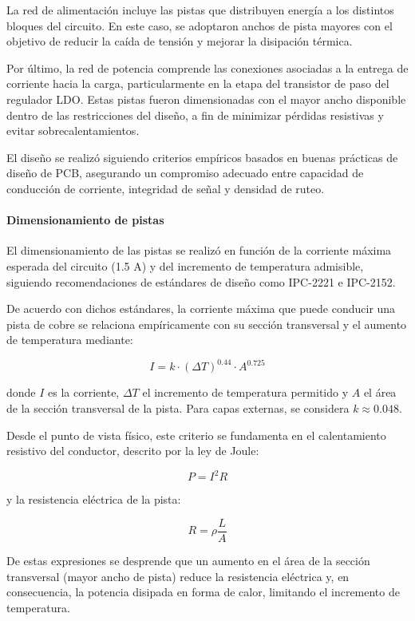\documentclass[]{article}
\begin{document}
	La red de alimentación incluye las pistas que distribuyen energía a los distintos bloques del circuito. En este caso, se adoptaron anchos de pista mayores con el objetivo de reducir la caída de tensión y mejorar la disipación térmica.
	
	Por último, la red de potencia comprende las conexiones asociadas a la entrega de corriente hacia la carga, particularmente en la etapa del transistor de paso del regulador LDO. Estas pistas fueron dimensionadas con el mayor ancho disponible dentro de las restricciones del diseño, a fin de minimizar pérdidas resistivas y evitar sobrecalentamientos.
	
	El diseño se realizó siguiendo criterios empíricos basados en buenas prácticas de diseño de PCB, asegurando un compromiso adecuado entre capacidad de conducción de corriente, integridad de señal y densidad de ruteo.
	
	
	\paragraph{Dimensionamiento de pistas}
	
	El dimensionamiento de las pistas se realizó en función de la corriente máxima esperada del circuito (1.5 A) y del incremento de temperatura admisible, siguiendo recomendaciones de estándares de diseño como IPC-2221 e IPC-2152.
	
	De acuerdo con dichos estándares, la corriente máxima que puede conducir una pista de cobre se relaciona empíricamente con su sección transversal y el aumento de temperatura mediante:
	
	\[
	I = k \cdot (\Delta T)^{0.44} \cdot A^{0.725}
	\]
	
	donde \( I \) es la corriente, \( \Delta T \) el incremento de temperatura permitido y \( A \) el área de la sección transversal de la pista. Para capas externas, se considera \( k \approx 0.048 \).
	
	Desde el punto de vista físico, este criterio se fundamenta en el calentamiento resistivo del conductor, descrito por la ley de Joule:
	
	\[
	P = I^2 R
	\]
	
	y la resistencia eléctrica de la pista:
	
	\[
	R = \rho \frac{L}{A}
	\]
	
	De estas expresiones se desprende que un aumento en el área de la sección transversal (mayor ancho de pista) reduce la resistencia eléctrica y, en consecuencia, la potencia disipada en forma de calor, limitando el incremento de temperatura.
	
\end{document}
